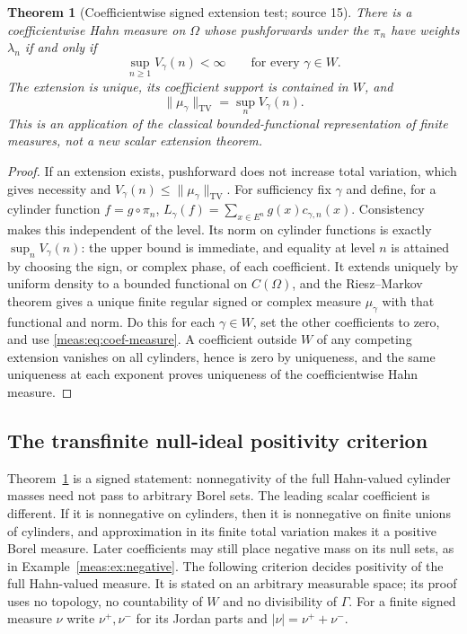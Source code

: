 \documentclass[11pt]{article}
\numberwithin{equation}{section}
\newtheorem{theorem}{Theorem}[section]
\theoremstyle{definition}
\theoremstyle{remark}
\newcommand{\TV}{\mathrm{TV}}
\newcommand{\norm}[1]{\lVert#1\rVert}
\newcommand{\abs}[1]{\lvert#1\rvert}
\begin{document}
\begin{theorem}[Coefficientwise signed extension test; source 15]
\label{meas:thm:extension}
There is a coefficientwise Hahn measure on $\Omega$ whose pushforwards under the
$\pi_n$ have weights $\lambda_n$ if and only if
\begin{equation}\label{meas:eq:var-test}
 \sup_{n\ge1}V_\gamma(n)<\infty\qquad\text{for every }\gamma\in W.
\end{equation}
The extension is unique, its coefficient support is contained in $W$, and
\begin{equation}\label{meas:eq:norm-exact}
 \norm{\mu_\gamma}_\TV=\sup_nV_\gamma(n).
\end{equation}
This is an application of the classical bounded-functional representation of
finite measures, not a new scalar extension theorem.
\end{theorem}
\begin{proof}
If an extension exists, pushforward does not increase total variation, which
gives necessity and $V_\gamma(n)\le\norm{\mu_\gamma}_\TV$. For sufficiency fix
$\gamma$ and define, for a cylinder function $f=g\circ\pi_n$,
$L_\gamma(f)=\sum_{x\in E^n}g(x)c_{\gamma,n}(x)$. Consistency makes this independent
of the level. Its norm on cylinder functions is exactly $\sup_nV_\gamma(n)$: the
upper bound is immediate, and equality at level $n$ is attained by choosing the
sign, or complex phase, of each coefficient. It extends uniquely by uniform
density to a bounded functional on $C(\Omega)$, and the Riesz--Markov theorem
gives a unique finite regular signed or complex measure $\mu_\gamma$ with that
functional and norm. Do this for each $\gamma\in W$, set the other coefficients
to zero, and use \eqref{meas:eq:coef-measure}. A coefficient outside $W$ of any
competing extension vanishes on all cylinders, hence is zero by uniqueness, and
the same uniqueness at each exponent proves uniqueness of the coefficientwise
Hahn measure.
\end{proof}

\subsection{The transfinite null-ideal positivity criterion}

Theorem~\ref{meas:thm:extension} is a signed statement: nonnegativity of
the full Hahn-valued cylinder masses need not pass to arbitrary Borel sets.
The leading scalar coefficient is different. If it is nonnegative on
cylinders, then it is nonnegative on finite unions of cylinders, and
approximation in its finite total variation makes it a positive Borel
measure. Later coefficients may still place negative mass on its null sets,
as in Example~\ref{meas:ex:negative}. The following criterion decides
positivity of the full Hahn-valued measure. It is stated on an arbitrary
measurable
space; its proof uses no topology, no countability of $W$ and no divisibility of
$\Gamma$. For a finite signed measure $\nu$ write $\nu^+,\nu^-$ for its Jordan
parts and $\abs\nu=\nu^++\nu^-$.
\end{document}
